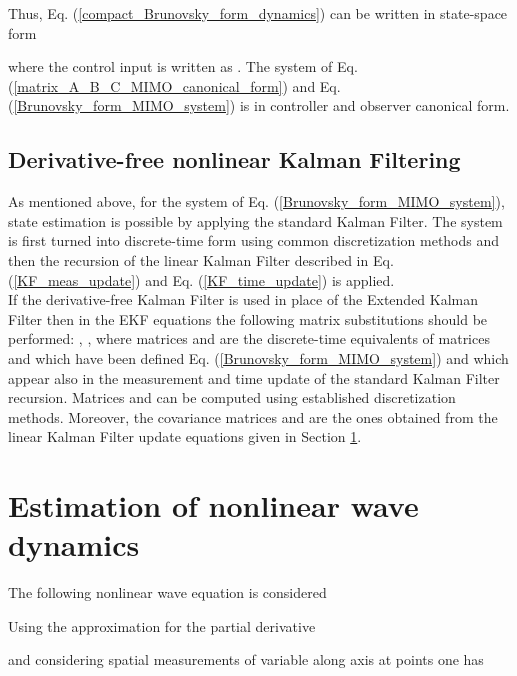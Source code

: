 \documentclass[journal]{IEEEtran}
\begin{document}
\noindent Thus, Eq. (\ref{compact_Brunovsky_form_dynamics}) can be written in state-space form



\noindent where the control input is written as . The system of Eq. (\ref{matrix_A_B_C_MIMO_canonical_form}) and Eq. (\ref{Brunovsky_form_MIMO_system}) is
in controller and observer canonical form.

\subsection{Derivative-free nonlinear Kalman Filtering} \label{subsection : flatness_based_control_2}

\noindent As mentioned above, for the system of Eq. (\ref{Brunovsky_form_MIMO_system}), state estimation is possible by applying the standard Kalman Filter. The system is first turned into discrete-time form using common discretization methods and then the recursion of the linear Kalman Filter described in Eq. (\ref{KF_meas_update}) and Eq. (\ref{KF_time_update}) is applied. \\

\noindent If the derivative-free Kalman Filter is used in place of the Extended Kalman Filter then in the EKF equations the following matrix substitutions should be performed: , , where  matrices  and  are the discrete-time equivalents of matrices  and  which have been defined Eq. (\ref{Brunovsky_form_MIMO_system}) and which appear also in the measurement and time update of the standard Kalman Filter recursion. Matrices  and  can be computed using established discretization methods. Moreover, the covariance matrices  and  are the ones obtained from the linear Kalman Filter update equations given in Section \ref{Section 3: Estimation_of_nonlinear_wave_equations}.\\

\section{Estimation of nonlinear wave dynamics} \label{Section 3: Estimation_of_nonlinear_wave_equations}

\noindent The following nonlinear wave equation is considered



\noindent Using the approximation for the partial derivative



\noindent and considering spatial measurements of variable  along axis  at points  one has
\end{document}
